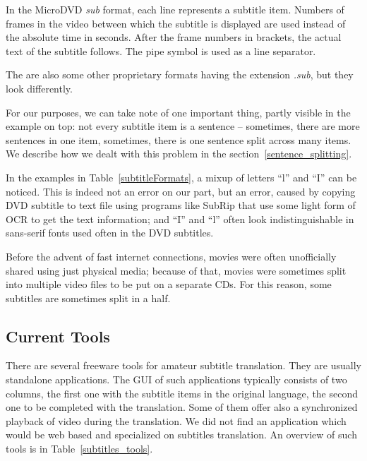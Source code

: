 In the MicroDVD \emph{sub} format, each line represents a subtitle item. Numbers of frames in the video between which the subtitle is displayed are used instead of the absolute time in seconds. After the frame numbers in brackets, the actual text of the subtitle follows. The pipe symbol is used as a line separator.

The are also some other proprietary formats having the extension \emph{.sub}, but they look differently.

For our purposes, we can take note of one important thing, partly visible in the example on top: not every subtitle item is a sentence -- sometimes, there are more sentences in one item, sometimes, there is one sentence split across many items. We describe how we dealt with this problem in the section~\ref{sentence_splitting}.

In the examples in Table~\ref{subtitleFormats}, a mixup of letters ``l'' and ``I'' can be noticed. This is indeed not an error on our part, but an error, caused by copying DVD subtitle to text file using programs like SubRip that use some light form of OCR to get the text information; and ``I'' and ``l'' often look indistinguishable in sans-serif fonts used often in the DVD subtitles.

Before the advent of fast internet connections, movies were often unofficially shared using just physical media; because of that, movies were sometimes split into multiple video files to be put on a separate CDs. For this reason, some subtitles are sometimes split in a half.

\subsection{Current Tools}

There are several freeware tools for amateur subtitle translation. They are usually standalone applications. The GUI of such applications typically consists of two columns, the first one with the subtitle items in the original language, the second one to be completed with the translation. Some of them offer also a synchronized playback of video during the translation. We did not find an application which would be web based and specialized on subtitles translation. An overview of such tools is in Table~\ref{subtitles_tools}.

